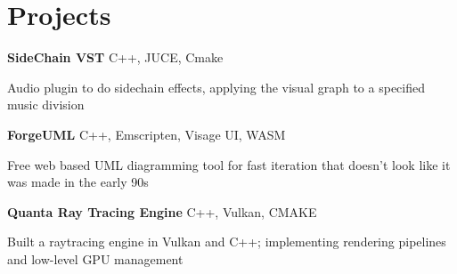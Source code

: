
\newenvironment{twocolentry_proj}[2][]{
    \onecolentry
    \def\secondColumn{#2}
    \setcolumnwidth{\fill, 7 cm}
    \begin{paracol}{2}
}{
    \switchcolumn \raggedleft \secondColumn
    \end{paracol}
    \endonecolentry
} %

\vspace{5 pt - 0.5 cm}
\section{Projects}
\begin{twocolentry_proj}{
    \mbox{}%
}
\fontsize{11 pt}{11 pt}\textbf{SideChain VST} C++, JUCE, Cmake
\end{twocolentry_proj}

\begin{onecolentry}
    \begin{highlights}
        \item Audio plugin to do sidechain effects, applying the visual graph to a specified music division
    \end{highlights}
\end{onecolentry}

\vspace{0.10 cm}
\begin{twocolentry_proj}{
    \mbox{}%
}
\fontsize{11 pt}{11 pt}\textbf{ForgeUML} C++, Emscripten, Visage UI, WASM
\end{twocolentry_proj}
\begin{onecolentry}
    \begin{highlights}
        \item Free web based UML diagramming tool for fast iteration that doesn't look like it was made in the early 90s
    \end{highlights}
\end{onecolentry}

\vspace{0.10 cm}
\begin{twocolentry_proj}{
    \mbox{}%
}
\fontsize{11 pt}{11 pt}\textbf{Quanta Ray Tracing Engine} C++, Vulkan, CMAKE
\end{twocolentry_proj}
\begin{onecolentry}
    \begin{highlights}
        \item Built a raytracing engine in Vulkan and C++; implementing rendering pipelines and low-level GPU management
    \end{highlights}
\end{onecolentry}

\vspace{0.2 cm}
